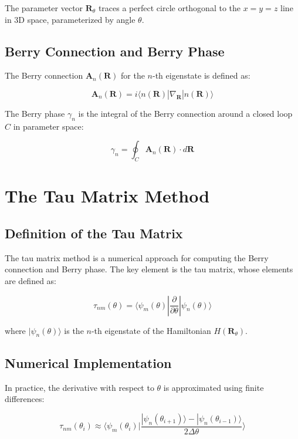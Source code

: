 \documentclass{article}
\begin{document}
The parameter vector $\bm{R}_\theta$ traces a perfect circle orthogonal to the $x=y=z$ line in 3D space, parameterized by angle $\theta$.

\subsection{Berry Connection and Berry Phase}

The Berry connection $\bm{A}_n(\bm{R})$ for the $n$-th eigenstate is defined as:

\begin{equation}
\bm{A}_n(\bm{R}) = i\langle n(\bm{R})|\nabla_{\bm{R}}|n(\bm{R})\rangle
\end{equation}

The Berry phase $\gamma_n$ is the integral of the Berry connection around a closed loop $C$ in parameter space:

\begin{equation}
\gamma_n = \oint_C \bm{A}_n(\bm{R}) \cdot d\bm{R}
\end{equation}

\section{The Tau Matrix Method}

\subsection{Definition of the Tau Matrix}

The tau matrix method is a numerical approach for computing the Berry connection and Berry phase. The key element is the tau matrix, whose elements are defined as:

\begin{equation}
\tau_{nm}(\theta) = \langle \psi_m(\theta) | \frac{\partial}{\partial\theta} | \psi_n(\theta) \rangle
\end{equation}

where $|\psi_n(\theta)\rangle$ is the $n$-th eigenstate of the Hamiltonian $H(\bm{R}_\theta)$.

\subsection{Numerical Implementation}

In practice, the derivative with respect to $\theta$ is approximated using finite differences:

\begin{equation}
\tau_{nm}(\theta_i) \approx \langle \psi_m(\theta_i) | \frac{|\psi_n(\theta_{i+1})\rangle - |\psi_n(\theta_{i-1})\rangle}{2\Delta\theta} \rangle
\end{equation}
\end{document}
